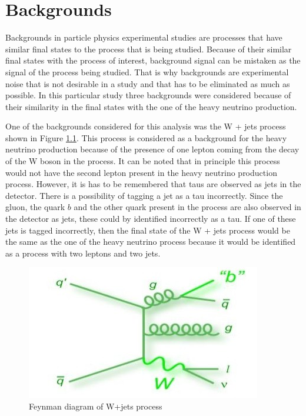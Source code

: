 \graphicspath{{Backgrounds/Figures/}}

\chapter{Backgrounds}

Backgrounds in particle physics experimental studies are processes that have similar final states to the process that is being studied. Because of their similar final states with the process of interest, background signal can be mistaken as the signal of the process being studied. That is why backgrounds are experimental noise that is not desirable in a study and that has to be eliminated as much as possible. In this particular study three backgrounds were considered because of their similarity in the final states with the one of the heavy neutrino production. 

One of the backgrounds considered for this analysis was the W + jets process shown in Figure \ref{fig: Wjets_background}. This process is considered as a background for the heavy neutrino production because of the presence of one lepton coming from the decay of the W boson in the process. It can be noted that in principle this process would not have the second lepton present in the heavy neutrino production process. However, it is has to be remembered that taus are observed as jets in the detector. There is a possibility of tagging a jet as a tau incorrectly. Since the gluon, the quark $b$ and the other quark present in the process are also observed in the detector as jets, these could by identified incorrectly as a tau. If one of these jets is tagged incorrectly, then the final state of the W + jets process would be the same as the one of the heavy neutrino process because it would be identified as a process with two leptons and two jets. 

\begin{figure}[H]
\centering
\includegraphics[width = 0.7\linewidth]{Wjets}
\caption{Feynman diagram of W+jets process}
\label{fig: Wjets_background}
\end{figure}

